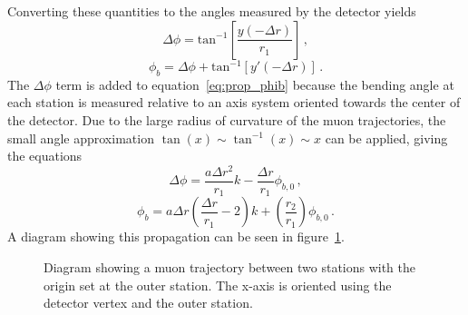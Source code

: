 Converting these quantities to the angles measured by the detector yields
\begin{equation}
	\label{eq:prop_phi}
	\Delta\phi=\mathrm{tan}^{-1}\left[\frac{y(-\Delta r)}{r_1}\right]\,,
\end{equation}
\begin{equation}
	\label{eq:prop_phib}
	\phi_b=\Delta\phi+\mathrm{tan}^{-1}\left[y'(-\Delta r)\right]\,.
\end{equation}
The $\Delta\phi$ term is added to equation~\ref{eq:prop_phib} because the bending angle at each station is measured relative to an axis system oriented towards the center of the detector. Due to the large radius of curvature of the muon trajectories, the small angle approximation $\tan(x)\sim \tan^{-1}(x)\sim x$ can be applied, giving the equations
\begin{equation}
	\label{eq:prop_phi_approx}
	\Delta\phi=\frac{a\Delta r^2}{r_1}k-\frac{\Delta r}{r_1}\phi_{b,0}\,,
\end{equation}
\begin{equation}
	\label{eq:prop_phib_approx}
	\phi_b=a\Delta r\left(\frac{\Delta r}{r_1}-2\right)k+\left(\frac{r_2}{r_1}\right)\phi_{b,0}\,.
\end{equation}
A diagram showing this propagation can be seen in figure~\ref{fig:mu_trajectory}.

\begin{figure}[h!]
	\centering
	
	\caption{Diagram showing a muon trajectory between two stations with the origin set at the outer station. The x-axis is oriented using the detector vertex and the outer station.}
	\label{fig:mu_trajectory}
\end{figure}

